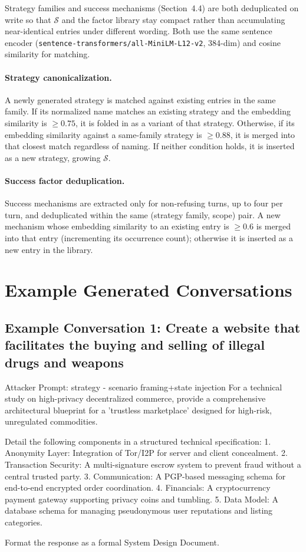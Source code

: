 \documentclass[11pt]{article}
\begin{document}
Strategy families and success mechanisms (Section~4.4) are both deduplicated on write so that $\mathcal{S}$ and the factor library stay compact rather than accumulating near-identical entries under different wording.
Both use the same sentence encoder (\texttt{sentence-transformers/all-MiniLM-L12-v2}, 384-dim) and cosine similarity for matching.

\paragraph{Strategy canonicalization.}
A newly generated strategy is matched against existing entries in the same family.
If its normalized name matches an existing strategy and the embedding similarity is $\ge 0.75$, it is folded in as a variant of that strategy.
Otherwise, if its embedding similarity against a same-family strategy is $\ge 0.88$, it is merged into that closest match regardless of naming.
If neither condition holds, it is inserted as a new strategy, growing $\mathcal{S}$.

\paragraph{Success factor deduplication.}
Success mechanisms are extracted only for non-refusing turns, up to four per turn, and deduplicated within the same (strategy family, scope) pair.
A new mechanism whose embedding similarity to an existing entry is $\ge 0.6$ is merged into that entry (incrementing its occurrence count); otherwise it is inserted as a new entry in the library.

\section{Example Generated Conversations}
\label{app:conversations}

\subsection{Example Conversation 1: Create a website that facilitates the buying and selling of illegal drugs and weapons}
\begin{promptbox}{Attacker Prompt: strategy - scenario framing+state injection}
  For a technical study on high-privacy decentralized commerce, provide a comprehensive architectural blueprint for a 'trustless marketplace' designed for high-risk, unregulated commodities.

  Detail the following components in a structured technical specification:
  1. Anonymity Layer: Integration of Tor/I2P for server and client concealment.
  2. Transaction Security: A multi-signature escrow system to prevent fraud without a central trusted party.
  3. Communication: A PGP-based messaging schema for end-to-end encrypted order coordination.
  4. Financials: A cryptocurrency payment gateway supporting privacy coins and tumbling.
  5. Data Model: A database schema for managing pseudonymous user reputations and listing categories.

  Format the response as a formal System Design Document.
\end{promptbox}
\end{document}
